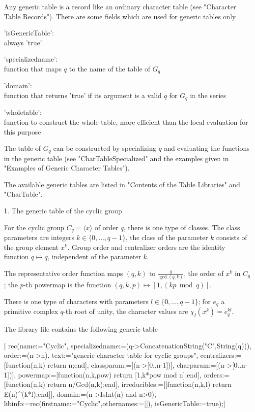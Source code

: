Any generic table  is  a  record  like an ordinary character  table  (see
"Character  Table Records").   There  are some  fields which are used for
generic tables only\:

'isGenericTable':\\
     always 'true'

'specializedname':\\
     function that maps $q$ to the name of the table of $G_q$

'domain':\\
     function that returns 'true' if its argument is a valid $q$ for $G_q$
     in the series

'wholetable':\\
     function to construct the whole table, more efficient than the local
     evaluation for this purpose

The table of $G_q$ can be constructed  by specializing $q$ and evaluating
the functions in the generic table  (see  "CharTableSpecialized"  and the
examples given in "Examples of Generic Character Tables").

The  available  generic  tables are  listed  in  "Contents of  the  Table
Libraries" and "CharTable".

%

1. The generic table of the cyclic group\:

For the cyclic group $C_q = \langle x \rangle$ of order $q$, there is one
type    of    classes.    The    class     parameters     are    integers
$k\in\{0,\ldots,q-1\}$, the class  of the parameter $k$ consists  of  the
group element $x^k$.  Group order and centralizer orders are the identity
function $q \mapsto q$, independent of the parameter $k$.

The representative order function maps $(q,k)$ to  $\frac{q}{\gcd(q,k)}$,
the order of $x^k$ in $C_q$; the $p$-th powermap is the function $(q,k,p)
\mapsto [1,(kp\bmod q)]$.

There is one  type of  characters with parameters $l\in\{0,\ldots,q-1\}$;
for $e_q$ a primitive complex $q$-th  root of unity, the character values
are $\chi_l(x^k) = e_q^{kl}$.

The library file contains the following generic table\:

|    rec(name:="Cyclic",
    specializedname:=(q->ConcatenationString("C",String(q))),
    order:=(n->n),
    text:="generic character table for cyclic groups",
    centralizers:=[function(n,k) return n;end],
    classparam:=[(n->[0..n-1])],
    charparam:=[(n->[0..n-1])],
    powermap:=[function(n,k,pow) return [1,k*pow mod n];end],
    orders:=[function(n,k) return n/Gcd(n,k);end],
    irreducibles:=[[function(n,k,l) return E(n)^(k*l);end]],
    domain:=(n->IsInt(n) and n>0),
    libinfo:=rec(firstname:="Cyclic",othernames:=[]),
    isGenericTable:=true);|

